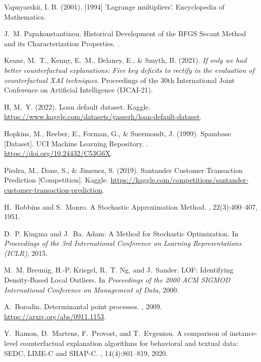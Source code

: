 \documentclass[12pt]{extarticle}
\numberwithin{equation}{section}
\begin{document}
\begin{thebibliography}{99}
Vapnyarskii, I. B. (2001). [1994]
\newblock 'Lagrange multipliers'. Encyclopedia of Mathematics.

J.~M. Papakonstantinou.
\newblock Historical Development of the BFGS Secant Method and its Characterization Properties.
.

Keane, M.~T., Kenny, E.~M., Delaney, E., \& Smyth, B. (2021).
\newblock \textit{If only we had better counterfactual explanations:
Five key deficits to rectify in the evaluation of counterfactual XAI techniques}.
Proceedings of the 30th International Joint Conference on Artificial
Intelligence (IJCAI-21).

\newblock H, M.~Y. (2022). Loan default dataset. Kaggle. 
\newblock \url{https://www.kaggle.com/datasets/yasserh/loan-default-dataset}.

\newblock Hopkins, M., Reeber, E., Forman, G., \& Suermondt, J. (1999). Spambase [Dataset]. UCI Machine Learning Repository. .
\newblock \url{https://doi.org/10.24432/C53G6X}.

\newblock Piedra, M., Dane, S., \& Jimenez, S. (2019). Santander Customer Transaction Prediction [Competition]. Kaggle.
\newblock \url{https://kaggle.com/competitions/santander-customer-transaction-prediction}.

H.~Robbins and S.~Monro.
\newblock A Stochastic Approximation Method.
, 22(3):400--407, 1951.

D.~P. Kingma and J.~Ba.
\newblock Adam: A Method for Stochastic Optimization.
\newblock In {\em Proceedings of the 3rd International Conference on Learning Representations (ICLR)}, 2015.

M.~M. Breunig, H.-P. Kriegel, R.~T. Ng, and J.~Sander.
\newblock LOF: Identifying Density-Based Local Outliers.
\newblock In {\em Proceedings of the 2000 ACM SIGMOD International Conference on Management of Data}, 2000.

A.~Borodin.
\newblock Determinantal point processes.
, 2009.
\newblock \url{https://arxiv.org/abs/0911.1153}.

Y.~Ramon, D.~Martens, F.~Provost, and T.~Evgeniou.
\newblock A comparison of instance-level counterfactual explanation algorithms for behavioral and textual data: SEDC, LIME-C and SHAP-C.
, 14(4):801--819, 2020.


\end{thebibliography}
\end{document}
